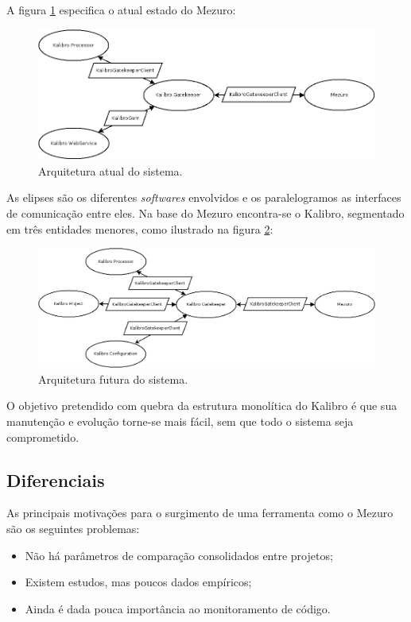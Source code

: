 \documentclass{llncs}
\begin{document}
  A figura \ref{fig:architecture-1} especifica o atual estado do Mezuro:
  \begin{figure}[H]
    \centering
    \includegraphics[width=\textwidth]{images/mezuro-architecture-actual.png}
    \caption{Arquitetura atual do sistema.}
    \label{fig:architecture-1}
  \end{figure}
  As elipses são os diferentes \textit{softwares} envolvidos e os paralelogramos as interfaces de comunicação entre eles. Na base do Mezuro encontra-se o Kalibro, segmentado em três entidades menores, como ilustrado na figura \ref{fig:architecture-2}:
  \begin{figure}[H]
    \centering
      \includegraphics[width=\textwidth]{images/mezuro-architecture-predicted.png}
    \caption{Arquitetura futura do sistema.}
    \label{fig:architecture-2}
  \end{figure}
  O objetivo pretendido com quebra da estrutura monolítica do Kalibro é que sua manutenção e evolução torne-se mais fácil, sem que todo o sistema seja comprometido.

  \subsection{Diferenciais} \label{subsec:motivacao}
  As principais motivações para o surgimento de uma ferramenta como o Mezuro são os seguintes problemas:
  \begin{itemize}
      \item Não há parâmetros de comparação consolidados entre projetos;
      \item Existem estudos, mas poucos dados empíricos;
      \item Ainda é dada pouca importância ao monitoramento de código.
  \end{itemize}
\end{document}
